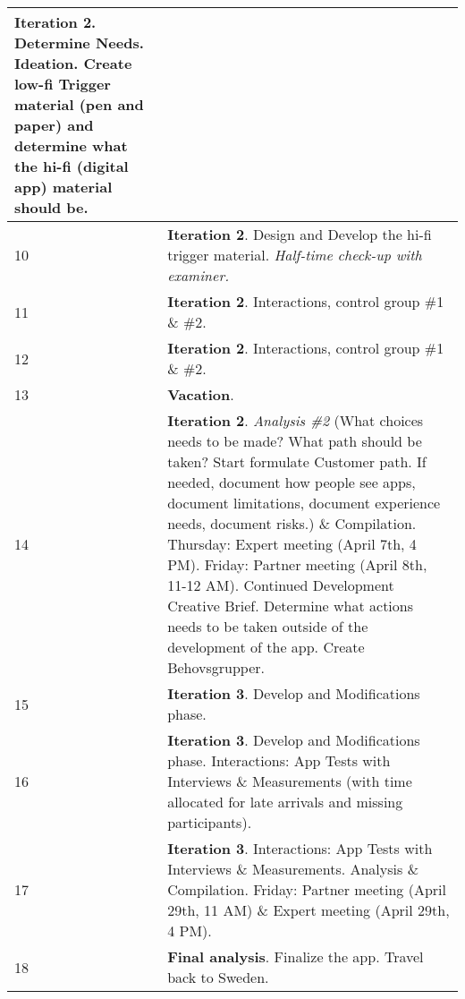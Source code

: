 \begin{center}
\begin{tabular}{ | l | p{10cm} |}
    \textbf{Iteration 2}. Determine Needs. Ideation. Create low-fi Trigger material (pen and paper) and determine what the hi-fi (digital app) material should be.
    \\ \hline
    10 & \textbf{Iteration 2}. Design and Develop the hi-fi trigger material. \textit{Half-time check-up with examiner.} \\ \hline
    11 & \textbf{Iteration 2}. Interactions, control group \#1 \& \#2. \\ \hline
    12 & \textbf{Iteration 2}. Interactions, control group \#1 \& \#2. %
    \\ \hline
    13 & \textbf{Vacation}. \\ \hline
    14 & \textbf{Iteration 2}. \textit{Analysis \#2} (What choices needs to be made? What path should be taken? Start formulate Customer path. If needed, document how people see apps, document limitations, document experience needs, document risks.) %
    \& Compilation. Thursday: Expert meeting (April 7th, 4 PM). Friday: Partner meeting (April 8th, 11-12 AM). Continued Development Creative Brief. Determine what actions needs to be taken outside of the development of the app. Create Behovsgrupper. \\ \hline

    15 & \textbf{Iteration 3}. Develop and Modifications phase. \\ \hline
    16 & \textbf{Iteration 3}. Develop and Modifications phase. Interactions: App Tests with Interviews \& Measurements (with time allocated for late arrivals and missing participants). \\ \hline
    17 & \textbf{Iteration 3}. Interactions: App Tests with Interviews \& Measurements.
    Analysis \& Compilation.
    Friday: Partner meeting (April 29th, 11 AM) \& Expert meeting (April 29th, 4 PM). \\ \hline
    18 & \textbf{Final analysis}. Finalize the app. Travel back to Sweden. \\ \hline
    \end{tabular}
\end{center}

